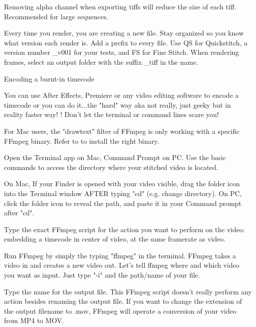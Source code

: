 \begin{fullwidth}

\tip Removing alpha channel when exporting tiffs will reduce the size of each tiff. Recommended for large sequences.

Every time you render, you are creating a new file. Stay organized so you know what version each render is. Add a prefix to every file. Use QS for Quickstitch, a version number \_v001 for your tests, and FS for Fine Stitch. When rendering frames, select an output folder with the suffix  \_tiff in the name.

\clearpage
{\large Encoding a burnt-in timecode \par}

You can use After Effects, Premiere or any video editing software to encode a timecode or you can do it...the "hard" way aka not really, just geeky but in reality faster way! \textbf{}! Don't let the terminal or command lines scare you!

For Mac users, the "drawtext" filter of FFmpeg is only working with a specific FFmpeg binary. Refer to \textbf{} to install the right binary.

Open the Terminal app on Mac, Command Prompt on PC. Use the basic commands to access the directory where your stitched video is located.


\tip On Mac, If your Finder is opened with your video visible, drag the folder icon into the Terminal window AFTER typing "cd" (e.g. change directory). On PC, click the folder icon to reveal the path, and paste it in your Command prompt after "cd".

Type the exact FFmpeg script for the action you want to perform on the video: embedding a timecode in center of video, at the same framerate as video.

Run FFmpeg by simply the typing "ffmpeg" in the terminal. FFmpeg takes a video in and creates a new video out. Let's tell ffmpeg where and which video you want as input. Just type "-i" and the path/name of your file.


Type the name for the output file. This FFmpeg script doesn't really perform any action besides renaming the output file. If you want to change the extension of the output filename to .mov, FFmpeg will operate a conversion of your video from MP4 to MOV.



\end{fullwidth}

